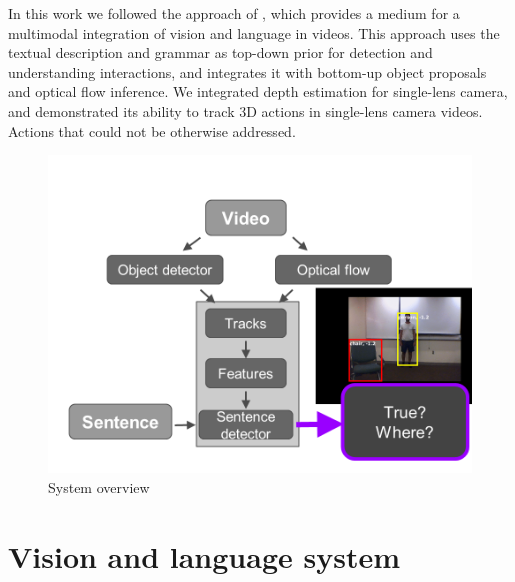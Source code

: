 \documentclass[10pt,twocolumn,letterpaper]{article}
\begin{document}
In this work we followed the approach of \cite{siddharth2014seeing}, which provides a medium for a multimodal integration of vision and language in videos. This approach uses the textual description and grammar as top-down prior for detection and understanding interactions, and integrates it with bottom-up object proposals and optical flow inference. We integrated depth estimation \cite{depthfayao} for single-lens camera, and demonstrated its ability to track 3D actions in single-lens camera videos. Actions that could not be otherwise addressed. 



\begin{figure}[ht]
\begin{center}
   \includegraphics[width=0.8\linewidth]{system_overview.png}
\end{center}
   \caption{System overview}
\label{fig_system}
\end{figure}

\section{Vision and language system}
\end{document}
